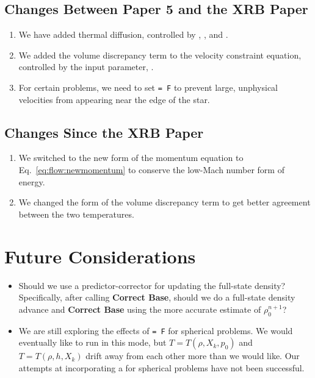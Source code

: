 \subsection{Changes Between Paper 5 and the XRB Paper}
\begin{enumerate}
\item We have added thermal diffusion, controlled by ,
, and .
\item We added the volume discrepancy term to the velocity constraint equation,
controlled by the input parameter, .
\item For certain problems, we need to set  {\tt = F}
to prevent large, unphysical velocities from appearing near the edge of the star.
\end{enumerate}

\subsection{Changes Since the XRB Paper}

\begin{enumerate}

\item We switched to the new form of the momentum equation to
Eq.~\ref{eq:flow:newmomentum} to conserve the low-Mach number form of
energy.

\item We changed the form of the volume discrepancy term to get better
agreement between the two temperatures.

\end{enumerate}



\section{Future Considerations}

\begin{itemize}
\item Should we use a predictor-corrector for updating the full-state density?
Specifically, after calling {\bf Correct Base}, should we do a full-state density 
advance and {\bf Correct Base} using the more accurate estimate of $\rho_0^{n+1}$?
\item We are still exploring the effects of   {\tt = F} for spherical
problems.  We would eventually like to run in this mode, but $T=T(\rho,X_k,p_0)$ 
and $T=T(\rho,h,X_k)$ drift away from each other more than we would like.  Our
attempts at incorporating a  for spherical problems have not 
been successful.
\end{itemize}

